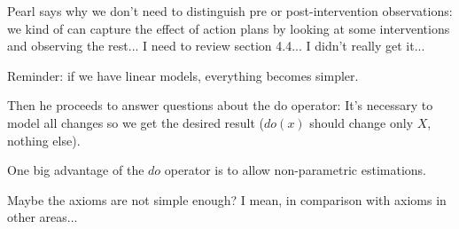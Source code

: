 Pearl says why we don't need to distinguish pre or post-intervention observations: we kind of can capture the effect of action plans by looking at some interventions and observing the rest... I need to review section 4.4... I didn't really get it...

Reminder: if we have linear models, everything becomes simpler.

Then he proceeds to answer questions about the do operator: It's necessary to model all changes so we get the desired result ($do(x)$ should change only $X$, nothing else).

One big advantage of the $do$ operator is to allow non-parametric estimations.

Maybe the axioms are not simple enough? I mean, in comparison with axioms in other areas...



